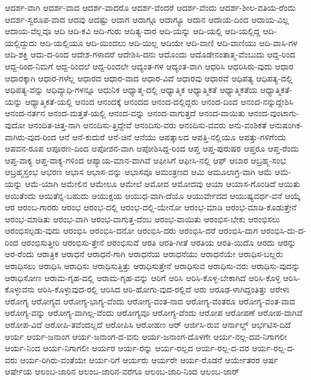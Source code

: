 {ಆದರ್ಶ-ವಾಗಿ
ಆದರ್ಶ-ವಾದ
ಆದರ್ಶ-ವಾದರೊ
ಆದರ್ಶ-ವೆಂದರೆ
ಆದರ್ಶ-ವೆಂದು
ಆದರ್ಶ-ಶೀಲ-ವತಿಯ-ರೆಂದು
ಆದರ್ಶ-ಸ್ವರೂಪ-ವಾದ
ಆದವು
ಆದಷ್ಟು
ಆದಾಗ
ಆದಾಗ್ಗೂ
ಆದಾಗ್ಯೂ
ಆದಾನ
ಆದಾಯ-ದಿಂದ
ಆದಾಯ-ವಿಲ್ಲ
ಆದಾಯ-ವೆಲ್ಲವೂ
ಆದಿ
ಆದಿ-ಕವಿ
ಆದಿ-ಗುರು
ಆದಿತ್ಯ-ವಾರ
ಆದಿ-ಯನ್ನು
ಆದಿ-ಯಲ್ಲಿ
ಆದಿ-ಯಲ್ಲಿದ್ದ
ಆದಿ-ಯಲ್ಲಿದ್ದುದು
ಆದಿ-ಯಲ್ಲಿಯೂ
ಆದಿ-ಯಿಂದಲು
ಆದಿ-ಯಿಲ್ಲ
ಆದಿಯೇ
ಆದಿ-ವಾಣಿ
ಆದಿ-ವಾಣಿಯು
ಆದಿ-ವಾಸಿ-ಗಳ
ಆದಿ-ಶಕ್ತಿ
ಆದು-ದ-ರಿಂದ
ಆದೇಶ-ಗಳಾದರೆ
ಆದೇಶಿಸಿ-ದನು
ಆದೊಂದು
ಆದೊಡೇನಂತಾತ್ಮ-ವೆಂಬುದು
ಆದ್ದ-ರಿಂದ
ಆದ್ದ-ರಿಂದ-ನಿಮಗೆ
ಆದ್ದ-ರಿಂದಲೆ
ಆದ್ದ-ರಿಂದಲೇ
ಆದ್ಯಂತ-ಗಳ
ಆದ್ಯಂತ-ವಾಗಿ
ಆಧರಿಸಿ
ಆಧರಿಸಿರು-ವುದು
ಆಧಾರ
ಆಧಾರಕ್ಕಾಗಿ
ಆಧಾರ-ಗಳೆಲ್ಲ
ಆಧಾರದ
ಆಧಾರ-ವಾದ
ಆಧಾರ-ವಿದೆ
ಆಧಾರವು
ಆಧಾರವೆ
ಆಧಿಪತ್ಯ
ಆಧಿಪತ್ಯ-ದಲ್ಲಿ
ಆಧಿಪತ್ಯ-ವನ್ನು
ಆಧಿವ್ಯಾಧಿ-ಗಳನ್ನೂ
ಆಧುನಿಕ
ಆಧ್ಯಾತ್ಮ-ದಲ್ಲಿ
ಆಧ್ಯಾತ್ಮಿಕ
ಆಧ್ಯಾತ್ಮಿಕತೆ
ಆಧ್ಯಾತ್ಮಿಕತೆಯ
ಆಧ್ಯಾತ್ಮಿಕತೆ-ಯನ್ನು
ಆಧ್ಯಾತ್ಮಿಕತೆ-ಯಲ್ಲಿ
ಆನಂದ
ಆನಂದಕ್ಕೆ
ಆನಂದದ
ಆನಂದ-ದಲ್ಲಿದ್ದರು
ಆನಂದ-ದಿಂದ
ಆನಂದ-ನನ್ನುದ್ದೇಶಿಸಿ
ಆನಂದ-ನರ್ತನ
ಆನಂದ-ಮತ್ತತೆ-ಯಲ್ಲಿ
ಆನಂದ-ವನ್ನು
ಆನಂದ-ವಾಗುತ್ತದೆ
ಆನಂದ-ವಾಯಿತು
ಆನಂದ-ವುಂಟಾಗು-ವುದೋ
ಆನಂದಿತ-ಚಿತ್ತ-ನಾಗಿ
ಆನಂದಿಸು-ತ್ತಿದ್ದೇವೆ
ಆನಂದಿಸು-ವರು
ಆನಂದಿಸು-ವವರು
ಆನು-ವಂಶಿಕತೆ
ಆನುಷಂಗಿಕ-ವಾಗಿರು-ವುದ-ರಿಂದ
ಆನೆ
ಆನೆ-ಕುದುರೆ
ಆನೆ-ಚಿನೆ
ಆನೆಯು
ಆಪತ್ಕಾಲದ
ಆಪತ್ತಿ-ನಲ್ಲಿಯೂ
ಆಪತ್ತು-ಗಳಿಗೆಂದು
ಆಪವನ-ರೂಪ
ಆಪೂರಣ-ದಿಂದ
ಆಪೋಶನ-ವಾಗಿ
ಆಪೋಶಿಸಿದ್ದ-ರಿಂದ
ಆಪ್ತ
ಆಪ್ತ-ಪುರುಷರ
ಆಪ್ತರೂ
ಆಪ್ತ-ರೆಂದು
ಆಪ್ತ-ವಾಕ್ಯ
ಆಪ್ತ-ವಾಕ್ಯ-ಗಳಿಂದ
ಆಪ್ಯಾಯ-ಮಾನ-ವಾಗಿವೆ
ಆಫೀಸಿಗೆ
ಆಫೀಸಿ-ನಲ್ಲಿ
ಆಫ್
ಆಬಾರ
ಆಬ್ರಹ್ಮ-ಸಂಭ
ಆಬ್ರಹ್ಮಸ್ತಂಭ
ಆಭರಣ
ಆಭಾಸ
ಆಭಾಸ-ವನ್ನು
ಆಭಾಸವೂ
ಆಮಂತ್ರಣದ
ಆಮಿ
ಆಮೂಲಾಗ್ರ-ವಾಗಿ
ಆಮೆ
ಆಮೆ-ಯನ್ನು
ಆಮೆ-ಯಾಗಿ
ಆಮೇಲಿನ
ಆಮೇಲೂ
ಆಮೇಲೆ
ಆಮೋದ
ಆಮೋದವು
ಆಯಾ
ಆಯಾಸ-ಗೊಂಡಿದೆ
ಆಯಿತು
ಆಯಿತೆಂದು
ಆಯಿತೆನ್ನ-ಬಹುದು
ಆಯುಕ್ಷಯ
ಆಯುಧ-ವಾಗಿ-ದೆಯೊ
ಆಯುರ್ವೇದದ
ಆಯುಷ್ಯವರ್ಧ-ವನೆ
ಆಯ್ಕೆ
ಆರ
ಆರಂಬ-ಗಾರರು
ಆರಂಭ
ಆರಂಭ-ದಲ್ಲಿ
ಆರಂಭ-ದಲ್ಲಿ-ಯೇನೋ
ಆರಂಭ-ಮಾಡಿ
ಆರಂಭ-ಮಾಡಿ-ಕೊಡುತ್ತೇನೆ
ಆರಂಭ-ಮಾಡಿತು
ಆರಂಭ-ವಾಗಿ
ಆರಂಭ-ವಾಗುತ್ತ-ದೆಂಬ
ಆರಂಭ-ವಾಯಿತು
ಆರಂಭಿಸ-ಬೇಕು
ಆರಂಭಿಸಲು
ಆರಂಭಿಸಲ್ಪಡು-ವುದು
ಆರಂಭಿಸಿ
ಆರಂಭಿಸಿ-ದನೋ
ಆರಂಭಿಸಿ-ದರು
ಆರಂಭಿಸಿ-ದರೆ
ಆರಂಭಿಸಿ-ದಾಗ
ಆರಂಭಿಸಿ-ದು-ದ-ರಿಂದ
ಆರಂಭಿಸುತ್ತೀರಿ
ಆರಂಭಿಸು-ತ್ತೇನೆ
ಆರಂಭಿಸುವೆ
ಆರತಿ
ಆರತಿ-ಗೀತೆ
ಆರತಿಯ
ಆರತಿ-ಯಿದೊ
ಆರದು
ಆರನ್ನು
ಆರ-ರೆಂದು
ಆರಾತ್ರಿಕ
ಆರಾಧನೆ
ಆರಾಧನೆ-ಗಾಗಿ
ಆರಾಧನೆಯ
ಆರಾಧನೆಯು
ಆರಾಧನೆಯೇ
ಆರಾಧಿಸ-ಬಲ್ಲರು
ಆರಾಧಿಸಲು
ಆರಾಧಿಸಿ
ಆರಾಧಿಸು
ಆರಾಧಿಸುತ್ತಿತ್ತು
ಆರಾಧಿಸುತ್ತೇನೆ
ಆರಾಧಿಸುವ
ಆರಾಧಿಸು-ವರು
ಆರಾಧಿಸು-ವುದನ್ನು
ಆರಾಧಿಸೋಣ
ಆರಾಮ-ಗೃಹ-ದಲ್ಲಿ
ಆರಾಮ-ಗೃಹ-ವನ್ನು
ಆರಿಗೆ
ಆರಿಸಿ
ಆರಿಸಿ-ಕೊಳ್ಳ-ಬೇಕಾಗಿದೆ
ಆರಿಸಿ-ಕೊಳ್ಳಿ
ಆರಿಸಿ-ಕೊಳ್ಳುವನು
ಆರಿಸಿ-ಕೊಳ್ಳುವುದ-ರಲ್ಲಿ
ಆರಿಸಿದ
ಆರಿ-ಹೋಗು-ವುದ-ರಲ್ಲಿದೆ
ಆರು
ಆರೂಢ-ಳಾಗಿದ್ದಂತಿತ್ತು
ಆರೇಳು
ಆರೋಗ್ಯ
ಆರೋಗ್ಯದ
ಆರೋಗ್ಯ-ಭಾಗ್ಯ-ವೆಂದು
ಆರೋಗ್ಯ-ವಂತ-ನಾದ
ಆರೋಗ್ಯ-ವಂತರೂ
ಆರೋಗ್ಯ-ವಂತ-ವಾದ
ಆರೋಗ್ಯ-ವನ್ನು
ಆರೋಗ್ಯ-ವಾಗಿಲ್ಲ-ವೆಂದು
ಆರೋಗ್ಯವೂ
ಆರೋಗ್ಯ-ವೆಂದು
ಆರೋಪ
ಆರೋಪಣೆ
ಆರೋಪ-ವಾಗಿವೆ
ಆರೋಪ-ವಿದೆ
ಆರೋಪಿ-ತವೆಂದಲ್ಲದೆ
ಆರೋಪಿಸಿ
ಆರೋಹಣ
ಆರ್
ಆರ್ಜಿಸಿ-ರುವ
ಆರ್ನಾಲ್ಡ್
ಆರ್ಭಟಿಸ-ದಿದೆ
ಆರ್ಯ
ಆರ್ಯ-ಜನಾಂಗ
ಆರ್ಯ-ಜನಾಂಗ-ದ-ವನು
ಆರ್ಯ-ಜನಾಂಗ-ದೊಳಗೇ
ಆರ್ಯ-ನಲ್ಲ-ದವ-ನಿಗಾಗಲೀ
ಆರ್ಯ-ನಿಂದ
ಆರ್ಯ-ನಿಗಾಗಲೀ
ಆರ್ಯರ
ಆರ್ಯ-ರನ್ನು
ಆರ್ಯ-ರಲ್ಲದ
ಆರ್ಯ-ರಲ್ಲ-ದ-ವರ
ಆರ್ಯ-ರಲ್ಲ-ದ-ವರು
ಆರ್ಯ-ರಿಗಿರು-ವಂತೆಯೇ
ಆರ್ಯ-ರಿಗೆ
ಆರ್ಯರು
ಆರ್ಯರೇ
ಆರ್ಯ-ರೊಡನೆ
ಆರ್ಯೇತರರ
ಆರ್ಷ
ಆರ್ಷೇಯ
ಆಲಂಬ-ಜಾರಿನ
ಆಲಂಬ-ಜಾರಿನ-ವರೆಗೂ
ಆಲಂಬ-ಜಾರಿ-ನಿಂದ
ಆಲಂಬ-ಜಾರ್
}
